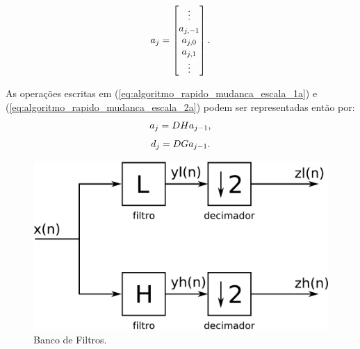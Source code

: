 \begin{frame}[allowframebreaks]
  \begin{equation}
  a_j = \begin{bmatrix} \vdots \\ a_{j,-1} \\ a_{j,0} \\ a_{j,1} \\ \vdots \\ \end{bmatrix} \textmd{.}
  \end{equation}

  \framebreak

  As operações escritas em (\ref{eq:algoritmo_rapido_mudanca_escala_1a}) e
  (\ref{eq:algoritmo_rapido_mudanca_escala_2a}) podem ser representadas então por:
  \begin{equation}
  a_{j} = D H a_{j-1} \textmd{,}
  \end{equation}
  \begin{equation}
  d_{j} = D G a_{j-1} \textmd{.}
  \end{equation}


  \begin{figure}[hptb]
  \centering
  \includegraphics[width=.3\textwidth]{images/banco_filtros.pdf}
  \caption{Banco de Filtros.}
  \label{fig:banco_filtros}
  \end{figure}

\end{frame}


